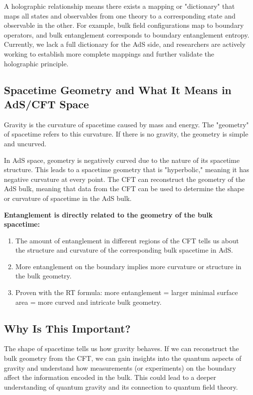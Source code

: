 \documentclass[12pt]{article}
\begin{document}
        A holographic relationship means there exists a mapping or "dictionary" that maps all states and observables from one theory to a corresponding state and observable in the other. For example, bulk field configurations map to boundary operators, and bulk entanglement corresponds to boundary entanglement entropy. Currently, we lack a full dictionary for the AdS side, and researchers are actively working to establish more complete mappings and further validate the holographic principle.

    \subsection{Spacetime Geometry and What It Means in AdS/CFT Space}
        \hspace{0.5cm} Gravity is the curvature of spacetime caused by mass and energy. The "geometry" of spacetime refers to this curvature. If there is no gravity, the geometry is simple and uncurved.

        In AdS space, geometry is negatively curved due to the nature of its spacetime structure. This leads to a spacetime geometry that is "hyperbolic," meaning it has negative curvature at every point. The CFT can reconstruct the geometry of the AdS bulk, meaning that data from the CFT can be used to determine the shape or curvature of spacetime in the AdS bulk.

        \textbf{Entanglement is directly related to the geometry of the bulk spacetime:}
        \begin{enumerate}
            \item The amount of entanglement in different regions of the CFT tells us about the structure and curvature of the corresponding bulk spacetime in AdS.
            \item More entanglement on the boundary implies more curvature or structure in the bulk geometry.
            \item Proven with the RT formula: more entanglement = larger minimal surface area = more curved and intricate bulk geometry.
        \end{enumerate}

    \subsection{Why Is This Important?}
        \hspace{0.5cm} The shape of spacetime tells us how gravity behaves. If we can reconstruct the bulk geometry from the CFT, we can gain insights into the quantum aspects of gravity and understand how measurements (or experiments) on the boundary affect the information encoded in the bulk. This could lead to a deeper understanding of quantum gravity and its connection to quantum field theory.
\end{document}
